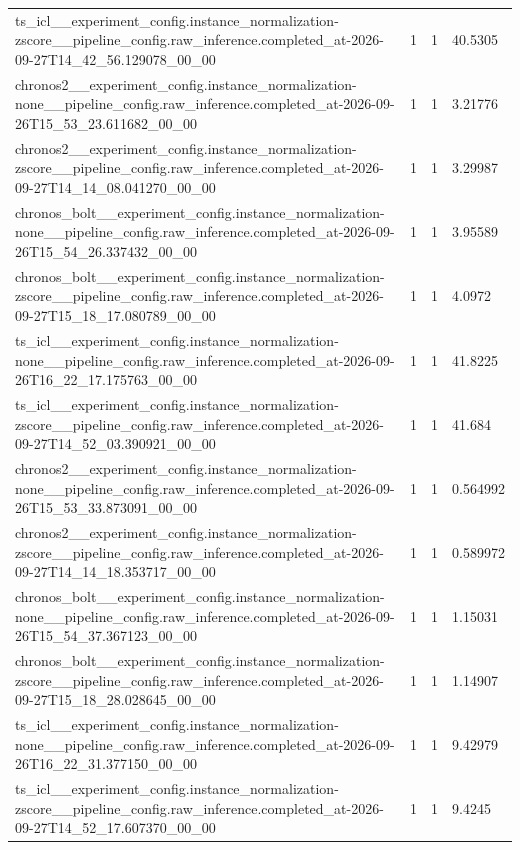 \begin{tabular}{llll}
ts\_icl\_\_experiment\_config.instance\_normalization-zscore\_\_pipeline\_config.raw\_inference.completed\_at-2026-09-27T14\_42\_56.129078\_00\_00 & 1 & 1 & 40.5305 \\
chronos2\_\_experiment\_config.instance\_normalization-none\_\_pipeline\_config.raw\_inference.completed\_at-2026-09-26T15\_53\_23.611682\_00\_00 & 1 & 1 & 3.21776 \\
chronos2\_\_experiment\_config.instance\_normalization-zscore\_\_pipeline\_config.raw\_inference.completed\_at-2026-09-27T14\_14\_08.041270\_00\_00 & 1 & 1 & 3.29987 \\
chronos\_bolt\_\_experiment\_config.instance\_normalization-none\_\_pipeline\_config.raw\_inference.completed\_at-2026-09-26T15\_54\_26.337432\_00\_00 & 1 & 1 & 3.95589 \\
chronos\_bolt\_\_experiment\_config.instance\_normalization-zscore\_\_pipeline\_config.raw\_inference.completed\_at-2026-09-27T15\_18\_17.080789\_00\_00 & 1 & 1 & 4.0972 \\
ts\_icl\_\_experiment\_config.instance\_normalization-none\_\_pipeline\_config.raw\_inference.completed\_at-2026-09-26T16\_22\_17.175763\_00\_00 & 1 & 1 & 41.8225 \\
ts\_icl\_\_experiment\_config.instance\_normalization-zscore\_\_pipeline\_config.raw\_inference.completed\_at-2026-09-27T14\_52\_03.390921\_00\_00 & 1 & 1 & 41.684 \\
chronos2\_\_experiment\_config.instance\_normalization-none\_\_pipeline\_config.raw\_inference.completed\_at-2026-09-26T15\_53\_33.873091\_00\_00 & 1 & 1 & 0.564992 \\
chronos2\_\_experiment\_config.instance\_normalization-zscore\_\_pipeline\_config.raw\_inference.completed\_at-2026-09-27T14\_14\_18.353717\_00\_00 & 1 & 1 & 0.589972 \\
chronos\_bolt\_\_experiment\_config.instance\_normalization-none\_\_pipeline\_config.raw\_inference.completed\_at-2026-09-26T15\_54\_37.367123\_00\_00 & 1 & 1 & 1.15031 \\
chronos\_bolt\_\_experiment\_config.instance\_normalization-zscore\_\_pipeline\_config.raw\_inference.completed\_at-2026-09-27T15\_18\_28.028645\_00\_00 & 1 & 1 & 1.14907 \\
ts\_icl\_\_experiment\_config.instance\_normalization-none\_\_pipeline\_config.raw\_inference.completed\_at-2026-09-26T16\_22\_31.377150\_00\_00 & 1 & 1 & 9.42979 \\
ts\_icl\_\_experiment\_config.instance\_normalization-zscore\_\_pipeline\_config.raw\_inference.completed\_at-2026-09-27T14\_52\_17.607370\_00\_00 & 1 & 1 & 9.4245 \\

\end{tabular}
